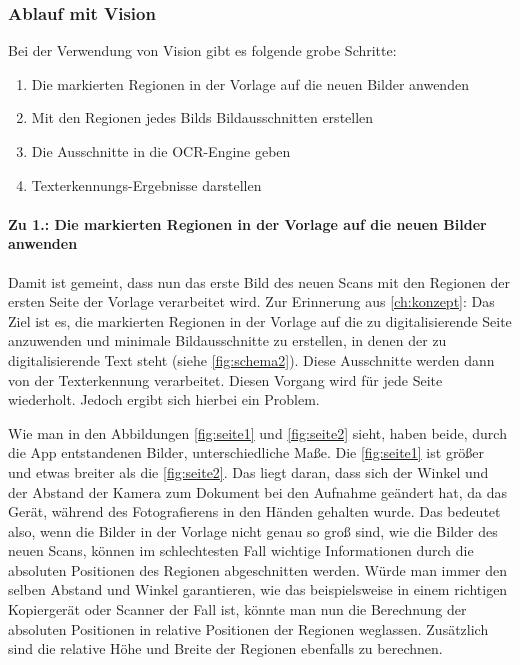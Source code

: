 \documentclass[notables, nomenclature, oneside, 150]{HSMW-Thesis}
\begin{document}
			\subsubsection*{Ablauf mit Vision}
				Bei der Verwendung von Vision gibt es folgende grobe Schritte:
				\begin{enumerate}
					\item Die markierten Regionen in der Vorlage auf die neuen Bilder anwenden
					\item Mit den Regionen jedes Bilds Bildausschnitten erstellen
					\item Die Ausschnitte in die OCR-Engine geben
					\item Texterkennungs-Ergebnisse darstellen
				\end{enumerate}
			
				\paragraph*{Zu 1.: Die markierten Regionen in der Vorlage auf die neuen Bilder anwenden}
				Damit ist gemeint, dass nun das erste Bild des neuen Scans mit den Regionen der ersten Seite der Vorlage verarbeitet wird. Zur Erinnerung aus \autoref{ch:konzept}: Das Ziel ist es, die markierten Regionen in der Vorlage auf die zu digitalisierende Seite anzuwenden und minimale Bildausschnitte zu erstellen, in denen der zu digitalisierende Text steht (siehe \autoref{fig:schema2}). Diese Ausschnitte werden dann von der Texterkennung verarbeitet. Diesen Vorgang wird für jede Seite wiederholt. Jedoch ergibt sich hierbei ein Problem.
				
				Wie man in den Abbildungen \ref{fig:seite1} und \ref{fig:seite2} sieht, haben beide, durch die App entstandenen Bilder, unterschiedliche Maße. Die \autoref{fig:seite1} ist größer und etwas breiter als die \autoref{fig:seite2}. Das liegt daran, dass sich der Winkel und der Abstand der Kamera zum Dokument bei den Aufnahme geändert hat, da das Gerät, während des Fotografierens in den Händen gehalten wurde. Das bedeutet also, wenn die Bilder in der Vorlage nicht genau so groß sind, wie die Bilder des neuen Scans, können im schlechtesten Fall wichtige Informationen durch die absoluten Positionen des Regionen abgeschnitten werden. Würde man immer den selben Abstand und Winkel garantieren, wie das beispielsweise in einem richtigen Kopiergerät oder Scanner der Fall ist, könnte man nun die Berechnung der absoluten Positionen in relative Positionen der Regionen weglassen. Zusätzlich sind die relative Höhe und Breite der Regionen ebenfalls zu berechnen. 
\end{document}
